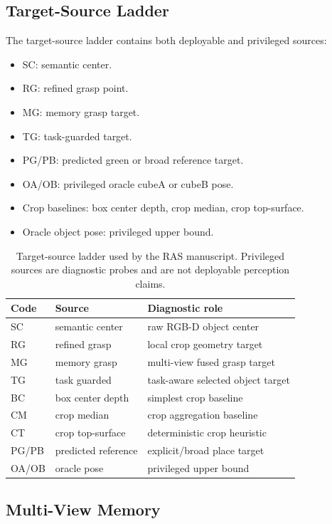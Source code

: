 \documentclass[preprint,12pt]{elsarticle}
\begin{document}
\subsection{Target-Source Ladder}

The target-source ladder contains both deployable and privileged sources:

\begin{itemize}
\item SC: semantic center.
\item RG: refined grasp point.
\item MG: memory grasp target.
\item TG: task-guarded target.
\item PG/PB: predicted green or broad reference target.
\item OA/OB: privileged oracle cubeA or cubeB pose.
\item Crop baselines: box center depth, crop median, crop top-surface.
\item Oracle object pose: privileged upper bound.
\end{itemize}

\begin{table}[t]
\centering
\caption{Target-source ladder used by the RAS manuscript. Privileged sources
are diagnostic probes and are not deployable perception claims.}
\label{tab:ras-target-sources}
\begin{tabular}{lll}
\toprule
Code & Source & Diagnostic role \\
\midrule
SC & semantic center & raw RGB-D object center \\
RG & refined grasp & local crop geometry target \\
MG & memory grasp & multi-view fused grasp target \\
TG & task guarded & task-aware selected object target \\
BC & box center depth & simplest crop baseline \\
CM & crop median & crop aggregation baseline \\
CT & crop top-surface & deterministic crop heuristic \\
PG/PB & predicted reference & explicit/broad place target \\
OA/OB & oracle pose & privileged upper bound \\
\bottomrule
\end{tabular}
\end{table}

\subsection{Multi-View Memory}
\end{document}
